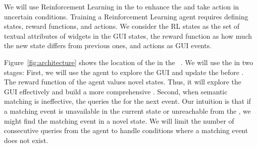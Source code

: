 \smallskip
We will use Reinforcement Learning in the \testreuse to enhance the \tam and take action in uncertain conditions.
Training a Reinforcement Learning agent requires defining  states, reward functions, and actions.
We consider the RL states as the set of textual attributes of widgets in the GUI states, the reward function as how much the new state differs from previous ones, and actions as GUI events.

\smallskip 
Figure~\ref{fig:architecture} shows the location of the \rlaganet in the \testreuse~\architecture.
We will use the \rlaganet in two stages: 
First, we will use the agent to explore the GUI and update the \tam before \testreuse.
The reward function of the agent values novel states. Thus,  it will explore the GUI effectively and build a more comprehensive \tam.
Second, when semantic matching is ineffective, the \selector queries the \rlaganet for the next event.
Our intuition is that if a matching event is unavailable in the current state or unreachable from the \tam, we might find the matching event in a novel state.
We will limit the number of consecutive queries from the agent to handle conditions where a matching event does not exist.



